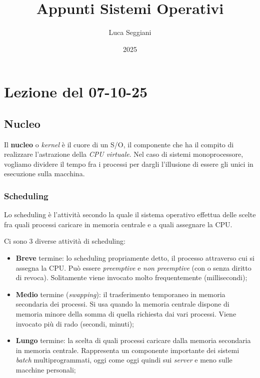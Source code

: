 \documentclass[a4paper,11pt]{article}
\title{Appunti Sistemi Operativi}
\author{Luca Seggiani}
\date{2025}
\begin{document}
\section{Lezione del 07-10-25}

\thispagestyle{empty}
\pagestyle{fancy}

\subsection{Nucleo}
Il \textbf{nucleo} o \textit{kernel} è il cuore di un S/O, il componente che ha il compito di realizzare l'astrazione della \textit{CPU virtuale}. Nel caso di sistemi monoprocessore, vogliamo dividere il tempo fra i processi per dargli l'illusione di essere gli unici in esecuzione sulla macchina.

\subsubsection{Scheduling}
Lo scheduling è l'attività secondo la quale il sistema operativo effettua delle scelte fra quali processi caricare in memoria centrale e a quali assegnare la CPU.

Ci sono 3 diverse attività di scheduling:
\begin{itemize}
	\item \textbf{Breve} termine: lo scheduling propriamente detto, il processo attraverso cui si assegna la CPU. Può essere \textit{preemptive} e \textit{non preemptive} (con o senza diritto di revoca). Solitamente viene invocato molto frequentemente (millisecondi);
	\item \textbf{Medio} termine (\textit{swapping}): il trasferimento temporaneo in memoria secondaria dei processi. Si usa quando la memoria centrale dispone di memoria minore della somma di quella richiesta dai vari processi. Viene invocato più di rado (secondi, minuti);
	\item \textbf{Lungo} termine: la scelta di quali processi caricare dalla memoria secondaria in memoria centrale. Rappresenta un componente importante dei sistemi \textit{batch} multiprogrammati, oggi come oggi quindi sui \textit{server} e meno sulle macchine personali;
\end{itemize}
\end{document}
